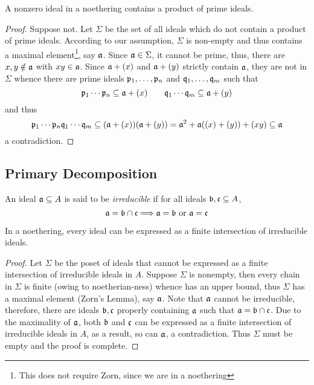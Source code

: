 \begin{proposition}
    A nonzero ideal in a noethering contains a product of prime ideals.
\end{proposition}
\begin{proof}
    Suppose not. Let $\Sigma$ be the set of all ideals which do not contain a product of prime ideals. According to our assumption, $\Sigma$ is non-empty and thus contains a maximal element\footnote{This does not require Zorn, since we are in a noethering}, say $\mathfrak a$. Since $\mathfrak a\in\Sigma$, it cannot be prime, thus, there are $x,y\notin\mathfrak a$ with $xy\in\mathfrak a$. Since $\mathfrak a + (x)$ and $\mathfrak a + (y)$ strictly contain $\mathfrak a$, they are not in $\Sigma$ whence there are prime ideals $\mathfrak p_1,\ldots,\mathfrak p_n$ and $\mathfrak q_1,\ldots,\mathfrak q_m$ such that 
    \begin{equation*}
        \mathfrak p_1\cdots\mathfrak p_n\subseteq\mathfrak a + (x)\qquad\mathfrak q_1\cdots\mathfrak q_m\subseteq\mathfrak a + (y)
    \end{equation*}
    and thus
    \begin{equation*}
        \mathfrak p_1\cdots\mathfrak p_n\mathfrak q_1\cdots\mathfrak q_m\subseteq(\mathfrak a + (x))(\mathfrak a + (y)) = \mathfrak a^2 + \mathfrak a((x) + (y)) + (xy)\subseteq\mathfrak a
    \end{equation*}
    a contradiction.
\end{proof}

\subsection{Primary Decomposition}

\begin{definition}[Irreducible]
    An ideal $\mathfrak a\subseteq A$ is said to be \textit{irreducible} if for all ideals $\mathfrak b,\mathfrak c\subseteq A$,
    \begin{equation*}
        \mathfrak a = \mathfrak b\cap\mathfrak c\Longrightarrow \mathfrak a = \mathfrak b\text{ or }\mathfrak a = \mathfrak c
    \end{equation*}
\end{definition}

\begin{lemma}
    In a noethering, every ideal can be expressed as a finite intersection of irreducible ideals.
\end{lemma}
\begin{proof}
    Let $\Sigma$ be the poset of ideals that cannot be expressed as a finite intersection of irreducible ideals in $A$. Suppose $\Sigma$ is nonempty, then every chain in $\Sigma$ is finite (owing to noetherian-ness) whence has an upper bound, thus $\Sigma$ has a maximal element (Zorn's Lemma), say $\mathfrak a$. Note that $\mathfrak a$ cannot be irreducible, therefore, there are ideals $\mathfrak b,\mathfrak c$ properly containing $\mathfrak a$ such that $\mathfrak a = \mathfrak b\cap\mathfrak c$. Due to the maximality of $\mathfrak a$, both $\mathfrak b$ and $\mathfrak c$ can be expressed as a finite intersection of irreducible ideals in $A$, as a result, so can $\mathfrak a$, a contradiction. Thus $\Sigma$ must be empty and the proof is complete.
\end{proof}

